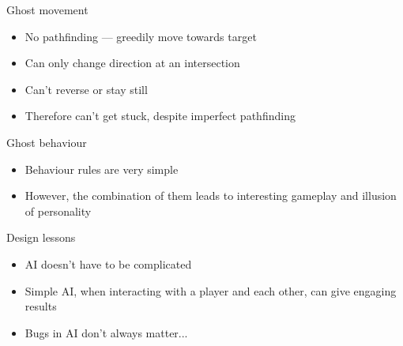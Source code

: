\begin{frame}{Ghost movement}
	\begin{itemize}
		\pause\item No pathfinding --- greedily move towards target
		\pause\item Can only change direction at an intersection
		\pause\item Can't reverse or stay still
		\pause\item Therefore can't get stuck, despite imperfect pathfinding
	\end{itemize}
\end{frame}

\begin{frame}{Ghost behaviour}
	\begin{itemize}
		\pause\item Behaviour rules are very simple
		\pause\item However, the combination of them leads to interesting gameplay and illusion of personality
	\end{itemize}
\end{frame}

\begin{frame}{Design lessons}
	\begin{itemize}
		\pause\item AI doesn't have to be complicated
		\pause\item Simple AI, when interacting with a player and each other, can give engaging results
		\pause\item Bugs in AI don't always matter...
	\end{itemize}
\end{frame}

